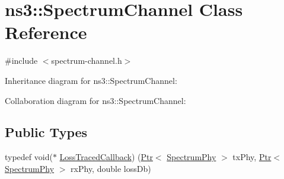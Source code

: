 \hypertarget{classns3_1_1SpectrumChannel}{}\section{ns3\+:\+:Spectrum\+Channel Class Reference}
\label{classns3_1_1SpectrumChannel}


{\ttfamily \#include $<$spectrum-\/channel.\+h$>$}



Inheritance diagram for ns3\+:\+:Spectrum\+Channel\+:


Collaboration diagram for ns3\+:\+:Spectrum\+Channel\+:
\subsection*{Public Types}
\begin{DoxyCompactItemize}
\item 
typedef void($\ast$ \hyperlink{classns3_1_1SpectrumChannel_a6f856ea135e2e176f489a38af311fba3}{Loss\+Traced\+Callback}) (\hyperlink{classns3_1_1Ptr}{Ptr}$<$ \hyperlink{classns3_1_1SpectrumPhy}{Spectrum\+Phy} $>$ tx\+Phy, \hyperlink{classns3_1_1Ptr}{Ptr}$<$ \hyperlink{classns3_1_1SpectrumPhy}{Spectrum\+Phy} $>$ rx\+Phy, double loss\+Db)
\end{DoxyCompactItemize}
